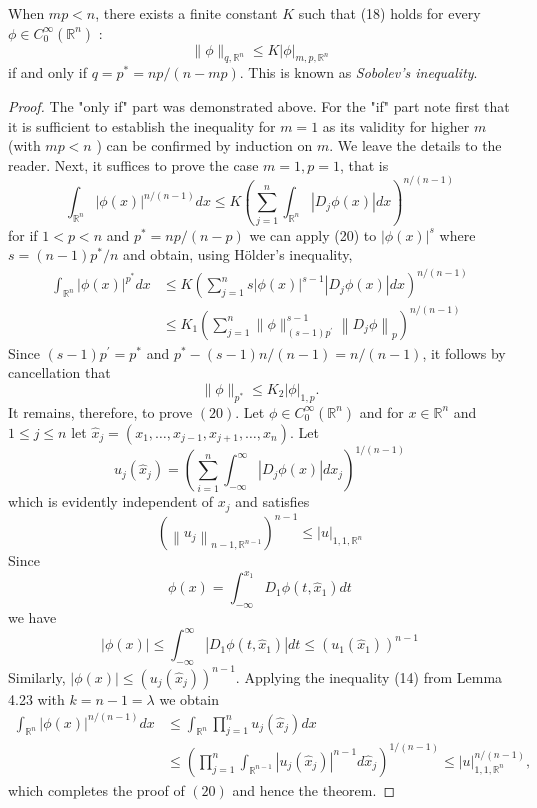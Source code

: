 \begin{theorem}
  When $m p<n$, there exists a finite constant $K$ such that (18) holds for every $\phi \in C_0^{\infty}\left(\mathbb{R}^n\right)$ :
  \[
  \|\phi\|_{q, \mathbb{R}^n} \leq K|\phi|_{m, p, \mathbb{R}^n}
  \]
  if and only if $q=p^*=n p /(n-m p)$. This is known as \emph{Sobolev's inequality}.
\end{theorem}

\begin{proof}
  The "only if" part was demonstrated above. For the "if" part note first that it is sufficient to establish the inequality for $m=1$ as its validity for higher $m$ (with $m p<n$ ) can be confirmed by induction on $m$. We leave the details to the reader.
  Next, it suffices to prove the case $m=1, p=1$, that is
  \[
  \int_{\mathbb{R}^n}|\phi(x)|^{n /(n-1)} d x \leq K\left(\sum_{j=1}^n \int_{\mathbb{R}^n}\left|D_j \phi(x)\right| d x\right)^{n /(n-1)}
  \]
  for if $1<p<n$ and $p^*=n p /(n-p)$ we can apply (20) to $|\phi(x)|^s$ where $s=(n-1) p^* / n$ and obtain, using Hölder's inequality,
  \[
  \begin{aligned}
  \int_{\mathbb{R}^n}|\phi(x)|^{p^*} d x & \leq K\left(\sum_{j=1}^n s|\phi(x)|^{s-1}\left|D_j \phi(x)\right| d x\right)^{n /(n-1)} \\
  & \leq K_1\left(\sum_{j=1}^n\|\phi\|_{(s-1) p^{\prime}}^{s-1}\left\|D_j \phi\right\|_p\right)^{n /(n-1)}
  \end{aligned}
  \]
  Since $(s-1) p^{\prime}=p^*$ and $p^*-(s-1) n /(n-1)=n /(n-1)$, it follows by cancellation that
  \[\|\phi\|_{p^*} \leq K_2 |\phi|_{1,p}.\]
  It remains, therefore, to prove $(20)$. Let $\phi \in C_0^{\infty}\left(\mathbb{R}^n\right)$ and for $x \in \mathbb{R}^n$ and $1 \leq j \leq n$ let $\hat{x}_j=\left(x_1, \ldots, x_{j-1}, x_{j+1}, \ldots, x_n\right)$. Let
  \[
  u_j\left(\hat{x}_j\right)=\left(\sum_{i=1}^n \int_{-\infty}^{\infty}\left|D_j \phi(x)\right| d x_j\right)^{1 /(n-1)}
  \]
  which is evidently independent of $x_j$ and satisfies
  \[
  \left(\left\|u_j\right\|_{n-1, \mathbb{R}^{n-1}}\right)^{n-1} \leq|u|_{1,1, \mathbb{R}^n}
  \]
  Since
  \[
  \phi(x)=\int_{-\infty}^{x_1} D_1 \phi\left(t, \hat{x}_1\right) d t
  \]
  we have
  \[
  |\phi(x)| \leq \int_{-\infty}^{\infty}\left|D_1 \phi\left(t, \hat{x}_1\right)\right| d t \leq\left(u_1\left(\hat{x}_1\right)\right)^{n-1}
  \]
  Similarly, $|\phi(x)| \leq\left(u_j\left(\hat{x}_j\right)\right)^{n-1}$. Applying the inequality (14) from Lemma 4.23 with $k=n-1=\lambda$ we obtain
  \[
  \begin{aligned}
  \int_{\mathbb{R}^n}|\phi(x)|^{n /(n-1)} d x & \leq \int_{\mathbb{R}^n} \prod_{j=1}^n u_j\left(\hat{x}_j\right) d x \\
  & \leq\left(\prod_{j=1}^n \int_{\mathbb{R}^{n-1}}\left|u_j\left(\hat{x}_j\right)\right|^{n-1} d \hat{x}_j\right)^{1 /(n-1)} \leq|u|_{1,1, \mathbb{R}^n}^{n /(n-1)},
  \end{aligned}
  \]
  which completes the proof of $(20)$ and hence the theorem.
\end{proof}


